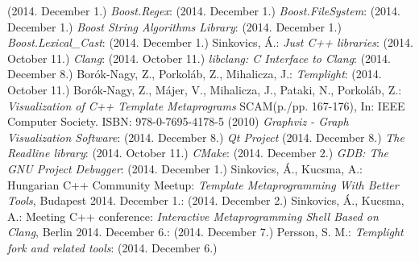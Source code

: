 \begin{thebibliography}{99}
    (2014. December 1.)
    \textit{Boost.Regex}:
    (2014. December 1.)
    \textit{Boost.FileSystem}:
    (2014. December 1.)
    \textit{Boost String Algorithms Library}:
    (2014. December 1.)
    \textit{Boost.Lexical\_Cast}:
    (2014. December 1.)
    Sinkovics, Á.:
    \textit{Just C++ libraries}:
     (2014. October 11.)
    \textit{Clang}:
     (2014. October 11.)
    \textit{libclang: C Interface to Clang}:
     (2014. December 8.)
    Borók-Nagy, Z., Porkoláb, Z., Mihalicza, J.:
    \textit{Templight}:
     (2014. October 11.)
    Borók-Nagy, Z., Májer, V., Mihalicza, J., Pataki, N., Porkoláb, Z.:
    \textit{Visualization of C++ Template Metaprograms} SCAM(p./pp. 167-176),
    In: IEEE Computer Society. ISBN: 978-0-7695-4178-5 (2010)
    \textit{Graphviz - Graph Visualization Software}:
     (2014. December 8.)
    \textit{Qt Project}
     (2014. December 8.)
    \textit{The Readline library}:
    (2014. October 11.)
    \textit{CMake}:
    (2014. December 2.)
    \textit{GDB: The GNU Project Debugger}:
    (2014. December 1.)
    Sinkovics, Á., Kucsma, A.:
    Hungarian C++ Community Meetup:
    \textit{Template Metaprogramming With Better Tools}, Budapest 2014.
    December 1.:
    (2014. December 2.)
    Sinkovics, Á., Kucsma, A.:
    Meeting C++ conference:
    \textit{Interactive Metaprogramming Shell Based on Clang}, Berlin 2014.
    December 6.:
    (2014. December 7.)
    Persson, S. M.:
    \textit{Templight fork and related tools}:
    (2014. December 6.)
\end{thebibliography}
